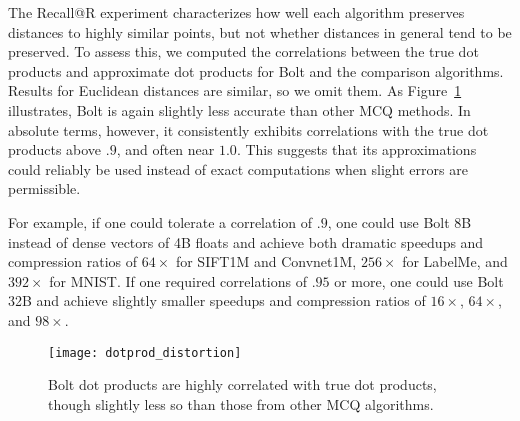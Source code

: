 The Recall@R experiment characterizes how well each algorithm preserves distances to highly similar points, but not whether distances in general tend to be preserved. To assess this, we computed the correlations between the true dot products and approximate dot products for Bolt and the comparison algorithms. Results for Euclidean distances are similar, so we omit them. As Figure~\ref{fig:dotprod_distortion} illustrates, Bolt is again slightly less accurate than other MCQ methods. In absolute terms, however, it consistently exhibits correlations with the true dot products above $.9$, and often near $1.0$. This suggests that its approximations could reliably be used instead of exact computations when slight errors are permissible.

For example, if one could tolerate a correlation of $.9$, one could use Bolt 8B instead of dense vectors of 4B floats and achieve both dramatic speedups and compression ratios of $64\times$ for SIFT1M and Convnet1M, $256\times$ for LabelMe, and $392\times$ for MNIST. If one required correlations of $.95$ or more, one could use Bolt 32B and achieve slightly smaller speedups and compression ratios of $16\times$, $64\times$, and $98\times$.

\begin{figure}[h]
\begin{center}
\texttt{[image: dotprod\_distortion]}
\caption{Bolt dot products are highly correlated with true dot products, though slightly less so than those from other MCQ algorithms.}
\label{fig:dotprod_distortion}
\end{center}
\end{figure}




